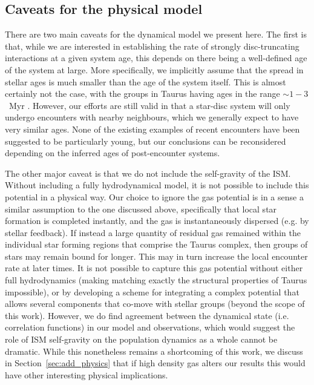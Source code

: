 \documentclass{aa}
\begin{document}
\subsection{Caveats for the physical model}
\label{sec:caveats}
{There are two main caveats for the dynamical model we present here. The first is that, while we are interested in establishing the rate of strongly disc-truncating interactions at a given system age, this depends on there being a well-defined age of the system at large. More specifically, we implicitly assume that the spread in stellar ages is much smaller than the age of the system itself. This is almost certainly not the case, with the groups in Taurus having ages in the range $\sim 1{-}3$~Myr \citep{Luhman23}. However, our efforts are still valid in that a star-disc system will only undergo encounters with nearby neighbours, which we generally expect to have very similar ages. None of the existing examples of recent encounters have been suggested to be particularly young, but our conclusions can be reconsidered depending on the inferred ages of post-encounter systems. }

{The other major caveat is that we do not include the self-gravity of the ISM. Without including a fully hydrodynamical model, it is not possible to include this potential in a physical way. Our choice to ignore the gas potential is in a sense a similar assumption to the one discussed above, specifically that local star formation is completed instantly, and the gas is instantaneously dispersed (e.g. by stellar feedback). If instead a large quantity of residual gas remained within the individual star forming regions that comprise the Taurus complex, then groups of stars may remain bound for longer. This may in turn increase the local encounter rate at later times. It is not possible to capture this gas potential without either full hydrodynamics (making matching exactly the structural properties of Taurus impossible), or by developing a scheme for integrating a complex potential that allows several components that co-move with stellar groups (beyond the scope of this work). However, we do find agreement between the dynamical state (i.e. correlation functions) in our model and observations, which would suggest the role of ISM self-gravity on the population dynamics as a whole cannot be dramatic. While this nonetheless remains a shortcoming of this work, we discuss in Section~\ref{sec:add_physics} that if high density gas alters our results this would have other interesting physical implications.}
\end{document}
